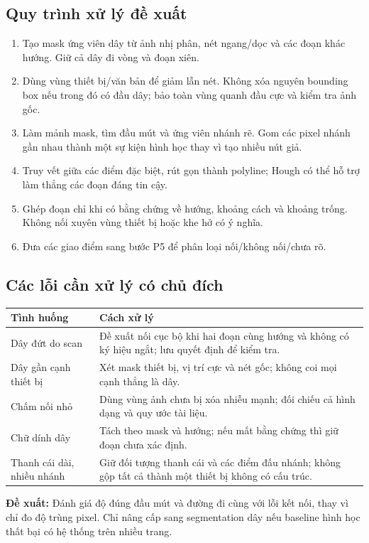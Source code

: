 \documentclass[11pt,a4paper]{article}
\newcommand{\decision}[1]{\par\smallskip\noindent\colorbox{Pale}{\parbox{\dimexpr\linewidth-2\fboxsep\relax}{\textbf{Đề xuất:} #1}}\par\smallskip}
\begin{document}
\subsection{Quy trình xử lý đề xuất}
\begin{enumerate}
\item Tạo mask ứng viên dây từ ảnh nhị phân, nét ngang/dọc và các đoạn khác hướng. Giữ cả dây đi vòng và đoạn xiên.
\item Dùng vùng thiết bị/văn bản để giảm lẫn nét. Không xóa nguyên bounding box nếu trong đó có đầu dây; bảo toàn vùng quanh đầu cực và kiểm tra ảnh gốc.
\item Làm mảnh mask, tìm đầu mút và ứng viên nhánh rẽ. Gom các pixel nhánh gần nhau thành một sự kiện hình học thay vì tạo nhiều nút giả.
\item Truy vết giữa các điểm đặc biệt, rút gọn thành polyline; Hough có thể hỗ trợ làm thẳng các đoạn đáng tin cậy.
\item Ghép đoạn chỉ khi có bằng chứng về hướng, khoảng cách và khoảng trống. Không nối xuyên vùng thiết bị hoặc khe hở có ý nghĩa.
\item Đưa các giao điểm sang bước P5 để phân loại nối/không nối/chưa rõ.
\end{enumerate}

\subsection{Các lỗi cần xử lý có chủ đích}
\begin{tabularx}{\linewidth}{@{}p{41mm}Y@{}}
\toprule
\textbf{Tình huống} & \textbf{Cách xử lý}\\\midrule
Dây đứt do scan & Đề xuất nối cục bộ khi hai đoạn cùng hướng và không có ký hiệu ngắt; lưu quyết định để kiểm tra.\\
Dây gần cạnh thiết bị & Xét mask thiết bị, vị trí cực và nét gốc; không coi mọi cạnh thẳng là dây.\\
Chấm nối nhỏ & Dùng vùng ảnh chưa bị xóa nhiễu mạnh; đối chiếu cả hình dạng và quy ước tài liệu.\\
Chữ dính dây & Tách theo mask và hướng; nếu mất bằng chứng thì giữ đoạn chưa xác định.\\
Thanh cái dài, nhiều nhánh & Giữ đối tượng thanh cái và các điểm đấu nhánh; không gộp tất cả thành một thiết bị không có cấu trúc.\\\bottomrule
\end{tabularx}

\decision{Đánh giá độ đúng đầu mút và đường đi cùng với lỗi kết nối, thay vì chỉ đo độ trùng pixel. Chỉ nâng cấp sang segmentation dây nếu baseline hình học thất bại có hệ thống trên nhiều trang.}
\end{document}
